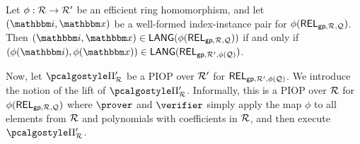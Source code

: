\documentclass[11pt,letterpaper,usenames,dvipsnames]{article}
\begin{document}
   \begin{lemma}\label{l: valid_instance_preserved_by_phi}
        Let $\phi:\mathcal{R}\to \mathcal{R}'$ be an efficient ring homomorphism, and    let  $(\idx,\inp)$ be a well-formed index-instance pair for  $\phi(\mathsf{REL}_{\mathsf{gp},\mathcal{R}, \mathcal{Q}})$. Then   $(\idx,\inp)\in \LANG(\phi(\REL_{\gparams,\R, \cQ}))$ if and only if $(\phi(\idx),\phi(\inp))\in \LANG(\REL_{\gparams,\R', \phi(\cQ)})$. 
   \end{lemma}

  
     Now, let $\prot_\R'$ be a PIOP over $\mathcal{R}'$ for $\mathsf{REL}_{\mathsf{gp},\mathcal{R}', \phi(\mathcal{Q})}$. We introduce the notion of the lift of $\prot_\R'$. Informally, this is a PIOP over $\mathcal{R}$ for $\phi(\mathsf{REL}_{\mathsf{gp},\mathcal{R}, \mathcal{Q}})$ where $\prover$ and $\verifier$ simply apply the map $\phi$ to all  elements from $\mathcal{R}$ and polynomials with coefficients in $\mathcal{R}$, and then execute $\prot_\R'$.
\end{document}
